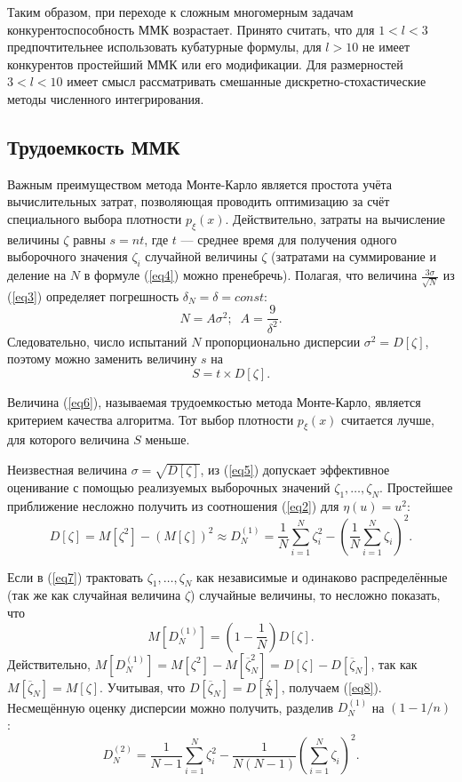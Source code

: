 \documentclass[
11pt,
master, %
subf, %
href, %
colorlinks=true, %
times, %
]{disser}
\begin{document}
Таким образом, при переходе к сложным многомерным задачам конкурентоспособность ММК возрастает. Принято считать, что для $1<l<3$ предпочтительнее использовать кубатурные формулы, для $l>10$ не имеет конкурентов простейший ММК или его модификации. Для размерностей $3<l<10$ имеет смысл рассматривать смешанные дискретно-стохастические методы численного интегрирования.

\subsection{Трудоемкость ММК}
Важным преимуществом метода Монте-Карло является простота учёта вычислительных затрат, позволяющая проводить оптимизацию за счёт специального выбора плотности $p_{\xi}(x)$. Действительно, затраты на вычисление величины $\zeta$ равны $s=nt$, где $t$ — среднее время для получения одного выборочного значения $\zeta_i$ случайной величины $\zeta$ (затратами на суммирование и деление на $N$ в формуле (\ref{eq4}) можно пренебречь). Полагая, что величина $\frac{3\sigma}{\sqrt{N}}$ из (\ref{eq3}) определяет погрешность $\delta_N = \delta = const$:
$$N = A\sigma^2;\;\; A = \frac{9}{\delta^2}.$$
Следовательно, число испытаний $N$ пропорционально дисперсии $\sigma^2 = D[\zeta]$, поэтому можно заменить величину $s$ на
\begin{equation}\label{eq6}
  S = t \times D[\zeta].
\end{equation}

Величина (\ref{eq6}), называемая трудоемкостью метода Монте-Карло, является критерием качества алгоритма. Тот выбор плотности $p_{\xi}(x)$ считается лучше, для которого величина $S$ меньше.

Неизвестная величина $\sigma = \sqrt{D[\zeta]}$, из (\ref{eq5}) допускает эффективное оценивание с помощью реализуемых выборочных значений $\zeta_1,\ldots,\zeta_N$. Простейшее приближение несложно получить из соотношения (\ref{eq2}) для $\eta(u) = u^2$:
\begin{equation}\label{eq7}
  D[\zeta] = M[\zeta^2] - (M[\zeta])^2 \approx D_N^{(1)} = \frac{1}{N}\sum_{i=1}^{N} \zeta^2_i - \left(\frac{1}{N} \sum_{i=1}^{N} \zeta_i\right)^2.
\end{equation}

Если в (\ref{eq7}) трактовать $\zeta_1,\ldots,\zeta_N$ как независимые и одинаково распределённые (так же как случайная величина $\zeta$) случайные величины, то несложно показать, что
\begin{equation}\label{eq8}
  M\left[D_N^{(1)}\right] = \left(1-\frac{1}{N}\right)D[\zeta].
\end{equation}
Действительно, $M\left[D_N^{(1)}\right] = M\left[\zeta^2\right] - M\left[\overline{\zeta}^2_N\right] = D[\zeta] - D\left[\overline{\zeta}_N\right]$, так как $M[\overline{\zeta}_N] = M[\zeta]$. Учитывая, что $D\left[\overline{\zeta}_N\right] = D\left[\frac{\zeta}{N}\right]$, получаем (\ref{eq8}). Несмещённую оценку дисперсии можно получить, разделив $D_N^{(1)}$ на $(1-1/n)$:
\begin{equation}\label{eq9}
  D_N^{(2)} = \frac{1}{N-1} \sum_{i=1}^{N}\zeta_i^2 - \frac{1}{N(N-1)}\left(\sum_{i=1}^{N}\zeta_i\right)^2.
\end{equation}
\end{document}
